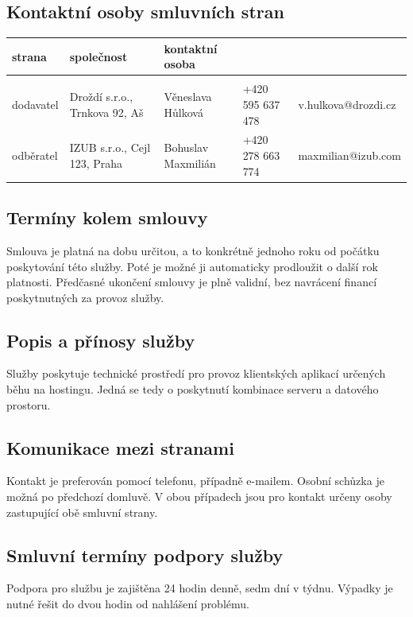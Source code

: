 \documentclass[11pt, a4paper, titlepage]{article}
\begin{document}
	\subsection*{Kontaktní osoby smluvních stran}
	\begin{tabular}{l|llll}
		strana    & společnost                         & kontaktní osoba    &                  & \\
		\hline \\
		dodavatel & Droždí s.r.o., Trnkova 92, Aš & Věneslava Hůlková  & +420 595 637 478 & v.hulkova@drozdi.cz \\
		odběratel & IZUB s.r.o., Cejl 123, Praha       & Bohuslav Maxmilián & +420 278 663 774 & maxmilian@izub.com \\
	\end{tabular}

	\subsection*{Termíny kolem smlouvy}

	Smlouva je platná na dobu určitou, a to konkrétně jednoho roku od počátku poskytování této služby. Poté je možné ji automaticky prodloužit o další rok platnosti. Předčasné ukončení smlouvy je plně validní, bez navrácení financí poskytnutných za provoz služby. 

	\subsection*{Popis a přínosy služby}

	Služby poskytuje technické prostředí pro provoz klientských aplikací určených běhu na hostingu. Jedná se tedy o poskytnutí kombinace serveru a datového prostoru.

	\subsection*{Komunikace mezi stranami}

	Kontakt je preferován pomocí telefonu, případně e-mailem. Osobní schůzka je možná po předchozí domluvě. V obou případech jsou pro kontakt určeny osoby zastupující obě smluvní strany.

	\subsection*{Smluvní termíny podpory služby}

	Podpora pro službu je zajištěna 24 hodin denně, sedm dní v týdnu. Výpadky je nutné řešit do dvou hodin od nahlášení problému.
\end{document}
